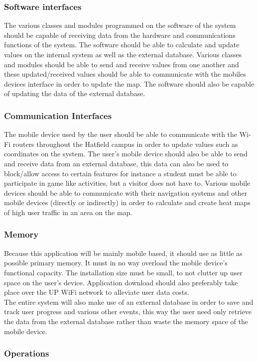 \documentclass[a4paper,12pt]{article}
\begin{document}
\subsubsection{Software interfaces}
The various classes and modules programmed on the software of the system should be capable of receiving data from the hardware and communications functions of the system. The software should be able to calculate and update values on the internal system as well as the external database. Various classes and modules should be able to send and receive values from one another and these updated/received values should be able to communicate with the mobiles devices interface in order to update the map. The software should also be capable of updating the data of the external database.\\
\subsubsection{Communication Interfaces}
The mobile device used by the user should be able to communicate with the Wi-Fi routers throughout the Hatfield campus in order to update values such as coordinates on the system. The user’s mobile device should also be able to send and receive data from an external database, this data can also be used to block/allow access to certain features for instance a student must be able to participate in game like activities, but a visitor does not have to. Various mobile devices should be able to communicate with their navigation systems and other mobile devices (directly or indirectly) in order to calculate and create heat maps of high user traffic in an area on the map.
\subsubsection{Memory}
Because this application will be mainly mobile based, it should use as little as possible primary memory. It must in no way overload the mobile device's functional capacity. The installation size must be small, to not clutter up user space on the user's device. Application download should also preferably take place over the UP WiFi network to alleviate user data costs.\\
The entire system will also make use of an external database in order to save and track user progress and various other events, this way the user need only retrieve the data from the external database rather than waste the memory space of the mobile device.
\subsubsection{Operations}
\end{document}
